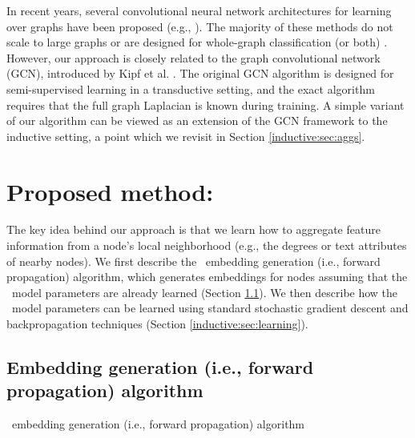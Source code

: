 In recent years, several convolutional neural network architectures for learning over graphs have been proposed (e.g., \cite{bruna2013spectral,duvenaud2015convolutional,
defferrard2016convolutional,kipf2016semi,niepert2016learning}).
The majority of these methods do not scale to large graphs or are designed for whole-graph classification (or both) \cite{bruna2013spectral,duvenaud2015convolutional,
defferrard2016convolutional,niepert2016learning}.
However, our approach is closely related to the graph convolutional network (GCN), introduced by Kipf et al. \cite{kipf2016semi,kipf2016variational}. 
The original GCN algorithm \cite{kipf2016semi} is designed for semi-supervised learning in a transductive setting, and the exact algorithm requires that the full graph Laplacian is known during training. 
A simple variant of our algorithm can be viewed as an extension of the GCN framework to the inductive setting, a point which we revisit in Section \ref{inductive:sec:aggs}. 



\section{Proposed method: \name}


The key idea behind our approach is that we learn how to aggregate feature information from a node's local neighborhood (e.g., the degrees or text attributes of nearby nodes). 
We first describe the  \name\ embedding generation (i.e., forward propagation) algorithm, which generates embeddings for nodes assuming that the \name\ model parameters are already learned (Section \ref{inductive:sec:foward}). 
We then describe how the \name\ model parameters can be learned using standard stochastic gradient descent and backpropagation techniques (Section \ref{inductive:sec:learning}). 



\subsection{Embedding generation (i.e., forward propagation) algorithm}\label{inductive:sec:foward} 

\label{inductive:sec:method}
\begin{algorithm}
\caption{\name\ embedding generation (i.e., forward propagation) algorithm}
\label{alg:basic}
    \BlankLine
     \;
    \For{}{
    	  \For{}{
    	  \;
    	  		
    	  }
    	  
    	}
      
\end{algorithm}

